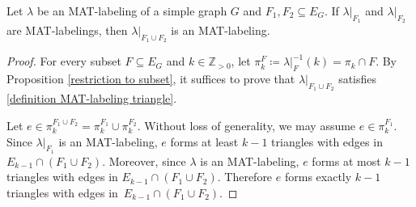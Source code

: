 \begin{lemma}\label{restriction to the union}
Let $ \lambda $ be an MAT-labeling of a simple graph $ G $ and $ F_{1}, F_{2} \subseteq E_{G} $. 
If $ \lambda|_{F_{1}} $ and $ \lambda|_{F_{2}} $ are MAT-labelings, then $ \lambda|_{F_{1} \cup F_{2}} $ is an MAT-labeling. 
\end{lemma}
\begin{proof}
For every subset $ F \subseteq E_{G} $ and $ k \in \mathbb{Z}_{>0} $, let $ \pi_{k}^{F} \coloneqq \lambda|_{F}^{-1}(k) = \pi_{k} \cap F $.
By Proposition  \ref{restriction to subset}, it suffices to prove that $ \lambda|_{F_{1} \cup F_{2}} $ satisfies \ref{definition MAT-labeling triangle}. 

Let $ e \in \pi_{k}^{F_{1}\cup F_{2}} = \pi_{k}^{F_{1}} \cup \pi_{k}^{F_{2}} $. 
Without loss of generality, we may assume $ e \in \pi_{k}^{F_{1}} $. 
Since $ \lambda|_{F_{1}} $ is an MAT-labeling, $ e $ forms at least $ k-1 $ triangles with edges in~$ E_{k-1} \cap (F_{1} \cup F_{2}) $. 
Moreover, since $ \lambda $ is an MAT-labeling, $ e $ forms at most $ k-1 $ triangles with edges in $ E_{k-1} \cap (F_{1} \cup F_{2}) $. 
Therefore $ e $ forms exactly $ k-1 $ triangles with edges in~$ E_{k-1} \cap (F_{1} \cup F_{2}) $. 
\end{proof}

